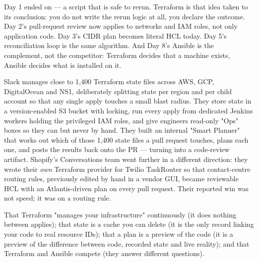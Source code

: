  Day 1 ended on  --- a script that is safe to rerun. Terraform is that idea taken to its conclusion: you do not write the rerun logic at all, you declare the outcome. Day 2's pull-request review now applies to networks and IAM roles, not only application code. Day 3's CIDR plan becomes literal HCL today. Day 5's reconciliation loop is the same algorithm. And Day 8's Ansible is the complement, not the competitor: Terraform decides that a machine exists, Ansible decides what is installed on it.

 Slack manages close to 1{,}400 Terraform state files across AWS, GCP, DigitalOcean and NS1, deliberately splitting state per region and per child account so that any single apply touches a small blast radius. They store state in a version-enabled S3 bucket with locking, run every apply from dedicated Jenkins workers holding the privileged IAM roles, and give engineers read-only "Ops" boxes so they can  but never  by hand. They built an internal "Smart Planner" that works out which of those 1{,}400 state files a pull request touches, plans each one, and posts the results back onto the PR --- turning  into a code-review artifact. Shopify's Conversations team went further in a different direction: they wrote their \emph{own} Terraform provider for Twilio TaskRouter so that contact-centre routing rules, previously edited by hand in a vendor GUI, became reviewable HCL with an Atlantis-driven plan on every pull request. Their reported win was not speed; it was  on a routing rule.

 That Terraform "manages your infrastructure" continuously (it does nothing between applies); that state is a cache you can delete (it is the only record linking your code to real resource IDs); that a plan is a preview of the code (it is a preview of the difference between code, recorded state and live reality); and that Terraform and Ansible compete (they answer different questions).


